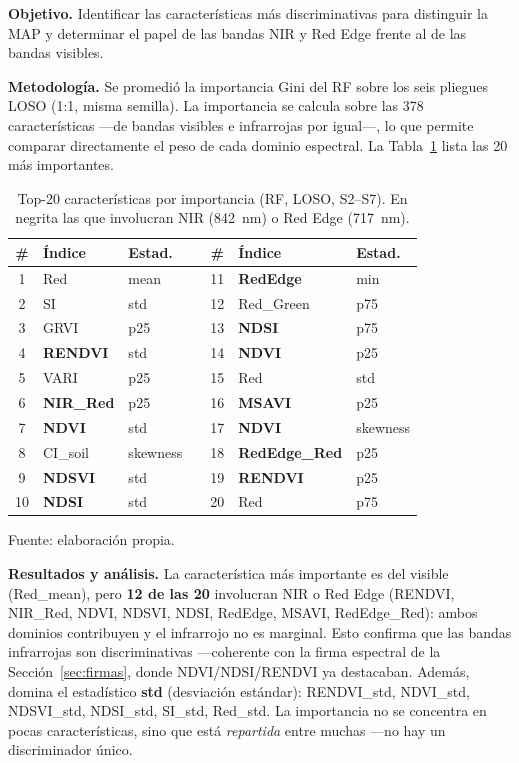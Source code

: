 \textbf{Objetivo.} Identificar las características más discriminativas
para distinguir la \ac{MAP} y determinar el papel de las bandas \ac{NIR} y Red
Edge frente al de las bandas visibles.

\textbf{Metodología.} Se promedió la importancia Gini del \ac{RF} sobre los seis
pliegues \ac{LOSO} (1:1, misma semilla). La importancia se calcula sobre las 378
características ---de bandas visibles e infrarrojas por igual---, lo que permite
comparar directamente el peso de cada dominio espectral. La
Tabla~\ref{tab:importancia} lista las 20 más importantes.

\begin{table}[H]
\centering
\caption{Top-20 características por importancia (RF, \ac{LOSO}, S2--S7).
         En negrita las que involucran \ac{NIR} (842~nm) o Red Edge (717~nm).}
\label{tab:importancia}
\small
\begin{tabular}{cll c cll}
\toprule
\# & Índice & Estad. & & \# & Índice & Estad. \\
\midrule
1  & Red & mean        & & 11 & \textbf{RedEdge} & min \\
2  & SI & std          & & 12 & Red\_Green & p75 \\
3  & GRVI & p25        & & 13 & \textbf{NDSI} & p75 \\
4  & \textbf{RENDVI} & std & & 14 & \textbf{NDVI} & p25 \\
5  & VARI & p25        & & 15 & Red & std \\
6  & \textbf{NIR\_Red} & p25 & & 16 & \textbf{MSAVI} & p25 \\
7  & \textbf{NDVI} & std & & 17 & \textbf{NDVI} & skewness \\
8  & CI\_soil & skewness & & 18 & \textbf{RedEdge\_Red} & p25 \\
9  & \textbf{NDSVI} & std & & 19 & \textbf{RENDVI} & p25 \\
10 & \textbf{NDSI} & std & & 20 & Red & p75 \\
\bottomrule
\end{tabular}

  {\footnotesize Fuente: elaboración propia.}
\end{table}

\textbf{Resultados y análisis.} La característica más importante es del visible
(Red\_mean), pero \textbf{12 de las 20} involucran \ac{NIR} o Red Edge (RENDVI,
NIR\_Red, NDVI, NDSVI, NDSI, RedEdge, MSAVI, RedEdge\_Red): ambos dominios
contribuyen y el infrarrojo no es marginal. Esto confirma que las bandas
infrarrojas son discriminativas ---coherente con la firma espectral de la
Sección~\ref{sec:firmas}, donde NDVI/NDSI/RENDVI ya destacaban. Además, domina el
estadístico \textbf{std} (desviación estándar): RENDVI\_std, NDVI\_std,
NDSVI\_std, NDSI\_std, SI\_std, Red\_std. La importancia no se concentra en pocas
características, sino que está \emph{repartida} entre muchas ---no hay un
discriminador único.

